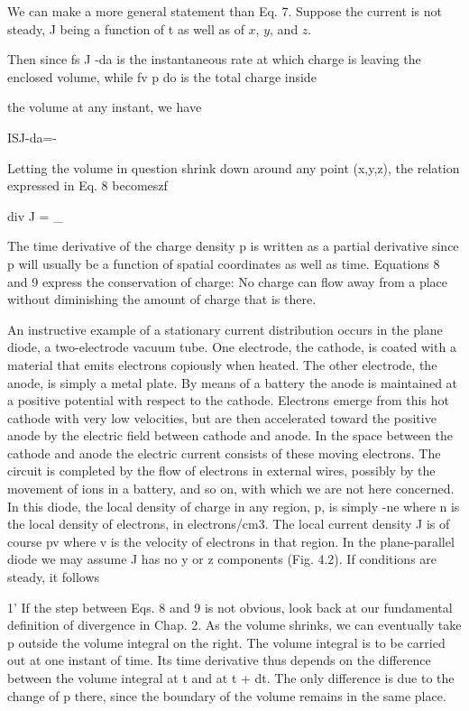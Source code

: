 We can make a more general statement than Eq. 7. Suppose the
current is not steady, J being a function of t as well as of $x$, $y$, and $z$.

Then since fs J -da is the instantaneous rate at which charge is
leaving the enclosed volume, while fv p do is the total charge inside

the volume at any instant, we have

ISJ-da=-%
\begin{equation}
\end{equation}

Letting the volume in question shrink down around any point
(x,y,z), the relation expressed in Eq. 8 becomeszf

div J = _ %
\begin{equation}
\end{equation}

The time derivative of the charge density p is written as a partial
derivative since p will usually be a function of spatial coordinates as
well as time. Equations 8 and 9 express the conservation of charge:
No charge can flow away from a place without diminishing the
amount of charge that is there.

An instructive example of a stationary current distribution occurs
in the plane diode, a two-electrode vacuum tube. One electrode, the
cathode, is coated with a material that emits electrons copiously
when heated. The other electrode, the anode, is simply a metal plate.
By means of a battery the anode is maintained at a positive potential
with respect to the cathode. Electrons emerge from this hot
cathode with very low velocities, but are then accelerated toward the
positive anode by the electric field between cathode and anode. In
the space between the cathode and anode the electric current consists
of these moving electrons. The circuit is completed by the flow
of electrons in external wires, possibly by the movement of ions in
a battery, and so on, with which we are not here concerned. In this
diode, the local density of charge in any region, p, is simply -ne
where n is the local density of electrons, in electrons/cm3. The local
current density J is of course pv where v is the velocity of electrons
in that region. In the plane-parallel diode we may assume J has no
y or z components (Fig. 4.2). If conditions are steady, it follows

1' If the step between Eqs. 8 and 9 is not obvious, look back at our fundamental definition
of divergence in Chap. 2. As the volume shrinks, we can eventually take p outside
the volume integral on the right. The volume integral is to be carried out at one instant
of time. Its time derivative thus depends on the difference between the volume integral
at t and at t + dt. The only difference is due to the change of p there, since the boundary
of the volume remains in the same place.


